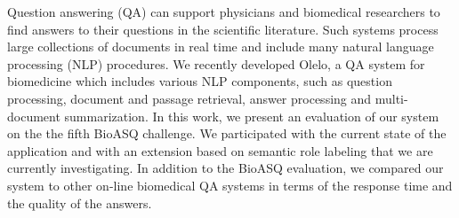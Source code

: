 Question answering (QA) can support physicians and biomedical researchers to find answers to their questions in the scientific literature. Such systems process large collections of documents in real time and include many natural language processing (NLP) procedures. We recently developed Olelo, a QA system for biomedicine which includes various NLP components, such as question processing, document and passage retrieval, answer processing and multi-document summarization. In this work, we present an evaluation of our system on the the fifth BioASQ challenge. We participated with the current state of the application and with an extension based on semantic role labeling that we are currently investigating. In addition to the BioASQ evaluation, we compared our system to other on-line biomedical QA systems in terms of the response time and the quality of the answers.
